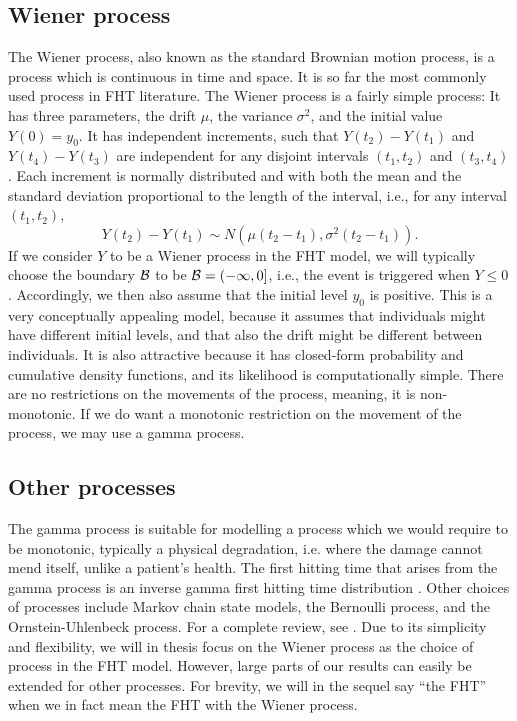 \subsection{Wiener process}\label{sec:wiener}
The Wiener process, also known as the standard Brownian motion process, is a process which is continuous in time and space. It is so far the most commonly used process in FHT literature. The Wiener process is a fairly simple process: It has three parameters, the drift $\mu$, the variance $\sigma^2$, and the initial value $Y(0)=y_0$. It has independent increments, such that $Y(t_2)-Y(t_1)$ and $Y(t_4)-Y(t_3)$ are independent for any disjoint intervals $(t_1,t_2)$ and $(t_3,t_4)$. Each increment is normally distributed and with both the mean and the standard deviation proportional to the length of the interval, i.e., for any interval $(t_1, t_2)$,
\begin{equation}
    Y(t_2)-Y(t_1)\sim N(\mu(t_2-t_1), \sigma^2(t_2-t_1)).
\end{equation}
If we consider $Y$ to be a Wiener process in the FHT model, we will typically choose the boundary $\mathcal{B}$ to be $\mathcal{B}=(-\infty,0]$, i.e., the event is triggered when $Y\leq0$. Accordingly, we then also assume that the initial level $y_0$ is positive. This is a very conceptually appealing model, because it assumes that individuals might have different initial levels, and that also the drift might be different between individuals. It is also attractive because it has closed-form probability and cumulative density functions, and its likelihood is computationally simple. There are no restrictions on the movements of the process, meaning, it is non-monotonic. If we do want a monotonic restriction on the movement of the process, we may use a gamma process.

\subsection{Other processes}
The gamma process is suitable for modelling a process which we would require to be monotonic, typically a physical degradation, i.e. where the damage cannot mend itself, unlike a patient's health. The first hitting time that arises from the gamma process is an inverse gamma first hitting time distribution \citep{leewhitmore2006}. Other choices of processes include Markov chain state models, the Bernoulli process, and the Ornstein-Uhlenbeck process. For a complete review, see \cite{leewhitmore2006}. Due to its simplicity and flexibility, we will in thesis focus on the Wiener process as the choice of process in the FHT model. However, large parts of our results can easily be extended for other processes. For brevity, we will in the sequel say ``the FHT'' when we in fact mean the FHT with the Wiener process.


